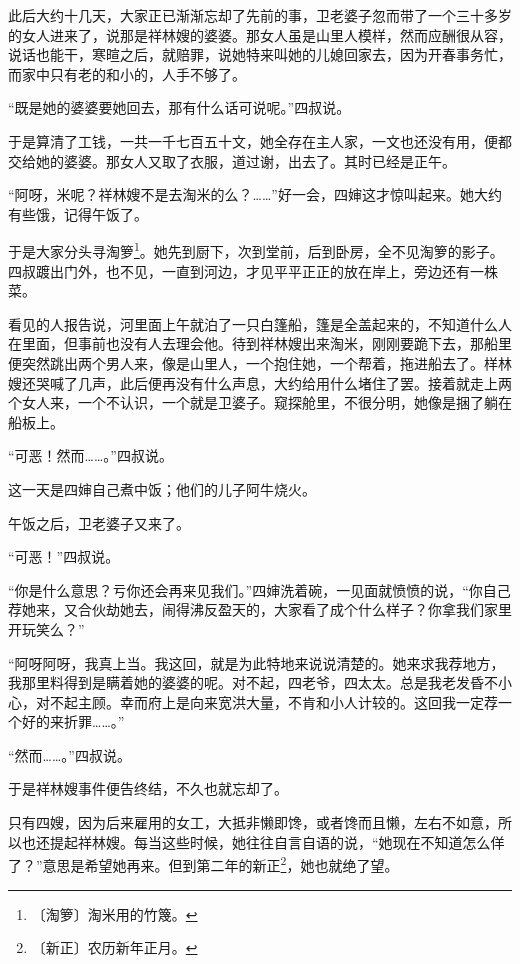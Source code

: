 \documentclass[12pt,UTF-8,openany]{ctexbook}
\begin{document}
\begin{large}
    此后大约十几天，大家正已渐渐忘却了先前的事，卫老婆子忽而带了一个三十多岁的女人进来了，说那是祥林嫂的婆婆。那女人虽是山里人模样，然而应酬很从容，说话也能干，寒暄之后，就赔罪，说她特来叫她的儿媳回家去，因为开春事务忙，而家中只有老的和小的，人手不够了。
    
    “既是她的婆婆要她回去，那有什么话可说呢。”四叔说。
    
    于是算清了工钱，一共一千七百五十文，她全存在主人家，一文也还没有用，便都交给她的婆婆。那女人又取了衣服，道过谢，出去了。其时已经是正午。
    
    “阿呀，米呢？祥林嫂不是去淘米的么？……”好一会，四婶这才惊叫起来。她大约有些饿，记得午饭了。
    
    于是大家分头寻淘箩\footnote{〔淘箩〕淘米用的竹篾。}。她先到厨下，次到堂前，后到卧房，全不见淘箩的影子。四叔踱出门外，也不见，一直到河边，才见平平正正的放在岸上，旁边还有一株菜。
    
    看见的人报告说，河里面上午就泊了一只白篷船，篷是全盖起来的，不知道什么人在里面，但事前也没有人去理会他。待到祥林嫂出来淘米，刚刚要跪下去，那船里便突然跳出两个男人来，像是山里人，一个抱住她，一个帮着，拖进船去了。样林嫂还哭喊了几声，此后便再没有什么声息，大约给用什么堵住了罢。接着就走上两个女人来，一个不认识，一个就是卫婆子。窥探舱里，不很分明，她像是捆了躺在船板上。
    
    “可恶！然而……。”四叔说。
    
    这一天是四婶自己煮中饭；他们的儿子阿牛烧火。
    
    午饭之后，卫老婆子又来了。
    
    “可恶！”四叔说。
    
    “你是什么意思？亏你还会再来见我们。”四婶洗着碗，一见面就愤愤的说，“你自己荐她来，又合伙劫她去，闹得沸反盈天的，大家看了成个什么样子？你拿我们家里开玩笑么？”
    
    “阿呀阿呀，我真上当。我这回，就是为此特地来说说清楚的。她来求我荐地方，我那里料得到是瞒着她的婆婆的呢。对不起，四老爷，四太太。总是我老发昏不小心，对不起主顾。幸而府上是向来宽洪大量，不肯和小人计较的。这回我一定荐一个好的来折罪……。”
    
    “然而……。”四叔说。
    
    于是祥林嫂事件便告终结，不久也就忘却了。
    
    只有四嫂，因为后来雇用的女工，大抵非懒即馋，或者馋而且懒，左右不如意，所以也还提起祥林嫂。每当这些时候，她往往自言自语的说，“她现在不知道怎么佯了？”意思是希望她再来。但到第二年的新正\footnote{〔新正〕农历新年正月。}，她也就绝了望。
    

\end{large}
\end{document}
